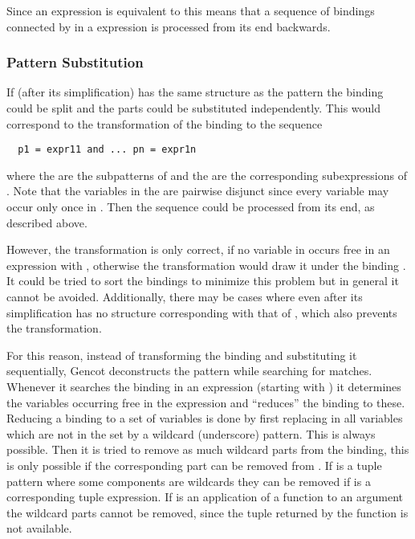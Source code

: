 Since an expression  is equivalent to  this means that a sequence of bindings connected by  in a  expression is processed
from its end backwards.

\subsubsection{Pattern Substitution}

If (after its simplification)  has the same structure as the pattern  the binding could be split and 
the parts could be substituted independently. This would correspond to the transformation of the binding 
to the sequence 
\begin{verbatim}
  p1 = expr11 and ... pn = expr1n
\end{verbatim}
where the  are the subpatterns of  and the  are the corresponding subexpressions of .
Note that the variables in the  are pairwise disjunct since every variable may occur only once in .
Then the sequence could be processed from its end, as described above.

However, the transformation is only correct, if no variable in  occurs free in an expression  with 
, otherwise the transformation would draw it under the binding . It could be tried to sort
the bindings to minimize this problem but in general it cannot be avoided. Additionally, there may be cases where 
even after its simplification has no structure corresponding with that of , which also prevents the transformation.

For this reason, instead of transforming the binding and substituting it sequentially, Gencot deconstructs the pattern while
searching for matches. Whenever it searches the binding  in an expression (starting with ) 
it determines the variables occurring free in the expression and ``reduces'' the binding to these. Reducing a binding to
a set of variables is done by first replacing in  all variables which are not in the set by a wildcard (underscore) 
pattern. This is always possible. Then it is tried to remove as much wildcard parts from the binding, this is only possible if
the corresponding part can be removed from . If  is a tuple pattern where some components are wildcards
they can be removed if  is a corresponding tuple expression. If  is an application of a function to
an argument the wildcard parts cannot be removed, since the tuple returned by the function is not available.

